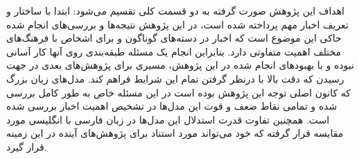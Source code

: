 
اهداف این پژوهش صورت گرفته به دو قسمت کلی تقسیم می‌شود:
ابتدا با ساختار و تعریف اخبار مهم پرداخته شده است، در این پژوهش نتیجه‌ها و بررسی‌های انجام شده حاکی این موضوع است که اخبار در دسته‌های گوناگون و برای اشخاص با فرهنگ‌های مختلف اهمیت متفاوتی دارد. بنابراین انجام یک مسئله طبقه‌بندی روی آنها کار آسانی نبوده و با بهبودهای انجام شده در این پژوهش، مسیری برای پژوهش‌های بعدی در جهت رسیدن که دقت بالا با درنظر گرفتن تمام این شرایط فراهم کند.
مدل‌های زبان بزرگ که کانون اصلی توجه این پژوهش بوده است در این مسئله خاص به طور کامل بررسی شده و تمامی نقاط ضعف و قوت این مدل‌ها در تشخیص اهمیت اخبار بررسی شده است. همچنین تفاوت قدرت استدلال این مدل‌ها در زبان فارسی با انگلیسی مورد مقایسه قرار گرفته که خود می‌تواند مورد استناد برای پژوهش‌های آینده در این زمینه قرار گیرد.
